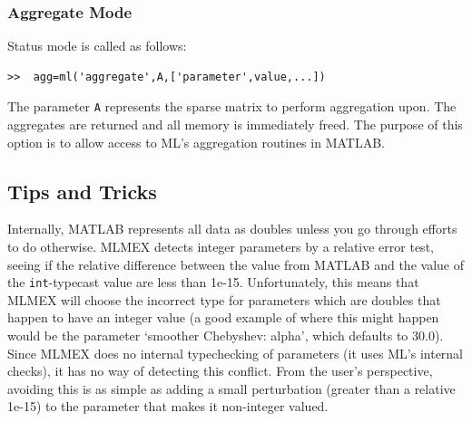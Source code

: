 \documentclass{article}[11pt]
\begin{document}
\subsubsection{Aggregate Mode}
Status mode is called as follows:
\begin{verbatim}
>>  agg=ml('aggregate',A,['parameter',value,...])
\end{verbatim}
The parameter \texttt{A} represents the sparse matrix to perform
aggregation upon.  The aggregates are returned and all memory is
immediately freed.  The purpose of this option is to allow access to
ML's aggregation routines in MATLAB.

\subsection{Tips and Tricks }\label{sec:mlmex:tips}

Internally, MATLAB represents all data as doubles unless you go
through efforts to do otherwise.  MLMEX detects integer parameters by
a relative error test, seeing if the relative difference between the
value from MATLAB and the value of the \texttt{int}-typecast value are
less than 1e-15.  Unfortunately, this means that MLMEX will choose the 
incorrect type for parameters which are doubles that happen to have an
integer value (a good example of where this might happen would be the parameter
`smoother Chebyshev: alpha', which defaults to 30.0).  Since MLMEX does no
internal typechecking of 
parameters (it uses ML's internal checks), it has no way of detecting
this conflict.  From the user's perspective, avoiding this is as
simple as adding a small perturbation (greater than a relative 1e-15)
to the parameter that makes it non-integer valued.






\end{document}
